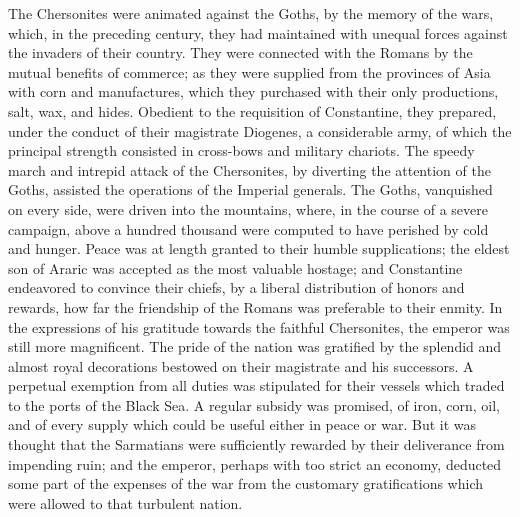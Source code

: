 The Chersonites were animated against the Goths, by the memory of
the wars, which, in the preceding century, they had maintained
with unequal forces against the invaders of their country. They
were connected with the Romans by the mutual benefits of
commerce; as they were supplied from the provinces of Asia with
corn and manufactures, which they purchased with their only
productions, salt, wax, and hides. Obedient to the requisition of
Constantine, they prepared, under the conduct of their magistrate
Diogenes, a considerable army, of which the principal strength
consisted in cross-bows and military chariots. The speedy march
and intrepid attack of the Chersonites, by diverting the
attention of the Goths, assisted the operations of the Imperial
generals. The Goths, vanquished on every side, were driven into
the mountains, where, in the course of a severe campaign, above a
hundred thousand were computed to have perished by cold and
hunger. Peace was at length granted to their humble
supplications; the eldest son of Araric was accepted as the most
valuable hostage; and Constantine endeavored to convince their
chiefs, by a liberal distribution of honors and rewards, how far
the friendship of the Romans was preferable to their enmity. In
the expressions of his gratitude towards the faithful
Chersonites, the emperor was still more magnificent. The pride of
the nation was gratified by the splendid and almost royal
decorations bestowed on their magistrate and his successors. A
perpetual exemption from all duties was stipulated for their
vessels which traded to the ports of the Black Sea. A regular
subsidy was promised, of iron, corn, oil, and of every supply
which could be useful either in peace or war. But it was thought
that the Sarmatians were sufficiently rewarded by their
deliverance from impending ruin; and the emperor, perhaps with
too strict an economy, deducted some part of the expenses of the
war from the customary gratifications which were allowed to that
turbulent nation.

